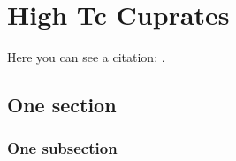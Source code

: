 \chapter{High Tc Cuprates}
Here you can see a citation: \cite{atc13}.

\lipsum[7]

\section{One section}

\lipsum[3]

\subsection{One subsection}

\lipsum[3]
